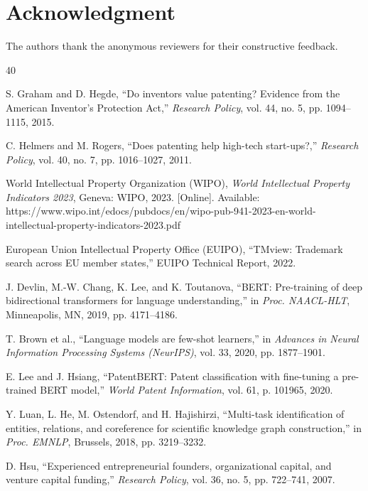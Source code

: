 \documentclass[conference]{IEEEtran}
\begin{document}
\section*{Acknowledgment}

The authors thank the anonymous reviewers for their constructive feedback.

\begin{thebibliography}{40}

S. Graham and D. Hegde, ``Do inventors value patenting? Evidence from the American Inventor's Protection Act,'' \textit{Research Policy}, vol. 44, no. 5, pp. 1094--1115, 2015.

C. Helmers and M. Rogers, ``Does patenting help high-tech start-ups?,'' \textit{Research Policy}, vol. 40, no. 7, pp. 1016--1027, 2011.

World Intellectual Property Organization (WIPO), \textit{World Intellectual Property Indicators 2023}, Geneva: WIPO, 2023. [Online]. Available: https://www.wipo.int/edocs/pubdocs/en/wipo-pub-941-2023-en-world-intellectual-property-indicators-2023.pdf

European Union Intellectual Property Office (EUIPO), ``TMview: Trademark search across EU member states,'' EUIPO Technical Report, 2022.

J. Devlin, M.-W. Chang, K. Lee, and K. Toutanova, ``BERT: Pre-training of deep bidirectional transformers for language understanding,'' in \textit{Proc. NAACL-HLT}, Minneapolis, MN, 2019, pp. 4171--4186.

T. Brown et al., ``Language models are few-shot learners,'' in \textit{Advances in Neural Information Processing Systems (NeurIPS)}, vol. 33, 2020, pp. 1877--1901.

E. Lee and J. Hsiang, ``PatentBERT: Patent classification with fine-tuning a pre-trained BERT model,'' \textit{World Patent Information}, vol. 61, p. 101965, 2020.

Y. Luan, L. He, M. Ostendorf, and H. Hajishirzi, ``Multi-task identification of entities, relations, and coreference for scientific knowledge graph construction,'' in \textit{Proc. EMNLP}, Brussels, 2018, pp. 3219--3232.

D. Hsu, ``Experienced entrepreneurial founders, organizational capital, and venture capital funding,'' \textit{Research Policy}, vol. 36, no. 5, pp. 722--741, 2007.


\end{thebibliography}
\end{document}
